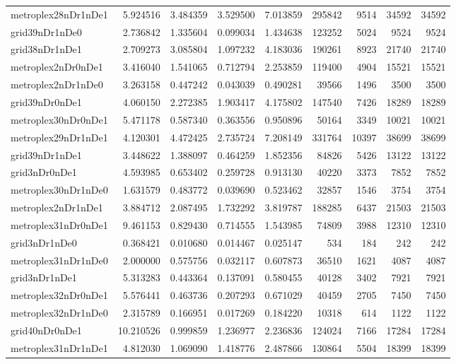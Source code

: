 \begin{longtable}{|l|r|r|r|r|r|r|r|r|}
metroplex28nDr1nDe1 & 5.924516 & 3.484359 & 3.529500 & 7.013859 & 295842 & 9514 & 34592 & 34592 \\
grid39nDr1nDe0 & 2.736842 & 1.335604 & 0.099034 & 1.434638 & 123252 & 5024 & 9524 & 9524 \\
grid38nDr1nDe1 & 2.709273 & 3.085804 & 1.097232 & 4.183036 & 190261 & 8923 & 21740 & 21740 \\
metroplex2nDr0nDe1 & 3.416040 & 1.541065 & 0.712794 & 2.253859 & 119400 & 4904 & 15521 & 15521 \\
metroplex2nDr1nDe0 & 3.263158 & 0.447242 & 0.043039 & 0.490281 & 39566 & 1496 & 3500 & 3500 \\
grid39nDr0nDe1 & 4.060150 & 2.272385 & 1.903417 & 4.175802 & 147540 & 7426 & 18289 & 18289 \\
metroplex30nDr0nDe1 & 5.471178 & 0.587340 & 0.363556 & 0.950896 & 50164 & 3349 & 10021 & 10021 \\
metroplex29nDr1nDe1 & 4.120301 & 4.472425 & 2.735724 & 7.208149 & 331764 & 10397 & 38699 & 38699 \\
grid39nDr1nDe1 & 3.448622 & 1.388097 & 0.464259 & 1.852356 & 84826 & 5426 & 13122 & 13122 \\
grid3nDr0nDe1 & 4.593985 & 0.653402 & 0.259728 & 0.913130 & 40220 & 3373 & 7852 & 7852 \\
metroplex30nDr1nDe0 & 1.631579 & 0.483772 & 0.039690 & 0.523462 & 32857 & 1546 & 3754 & 3754 \\
metroplex2nDr1nDe1 & 3.884712 & 2.087495 & 1.732292 & 3.819787 & 188285 & 6437 & 21503 & 21503 \\
metroplex31nDr0nDe1 & 9.461153 & 0.829430 & 0.714555 & 1.543985 & 74809 & 3988 & 12310 & 12310 \\
grid3nDr1nDe0 & 0.368421 & 0.010680 & 0.014467 & 0.025147 & 534 & 184 & 242 & 242 \\
metroplex31nDr1nDe0 & 2.000000 & 0.575756 & 0.032117 & 0.607873 & 36510 & 1621 & 4087 & 4087 \\
grid3nDr1nDe1 & 5.313283 & 0.443364 & 0.137091 & 0.580455 & 40128 & 3402 & 7921 & 7921 \\
metroplex32nDr0nDe1 & 5.576441 & 0.463736 & 0.207293 & 0.671029 & 40459 & 2705 & 7450 & 7450 \\
metroplex32nDr1nDe0 & 2.315789 & 0.166951 & 0.017269 & 0.184220 & 10318 & 614 & 1122 & 1122 \\
grid40nDr0nDe1 & 10.210526 & 0.999859 & 1.236977 & 2.236836 & 124024 & 7166 & 17284 & 17284 \\
metroplex31nDr1nDe1 & 4.812030 & 1.069090 & 1.418776 & 2.487866 & 130864 & 5504 & 18399 & 18399 \\

\end{longtable}
